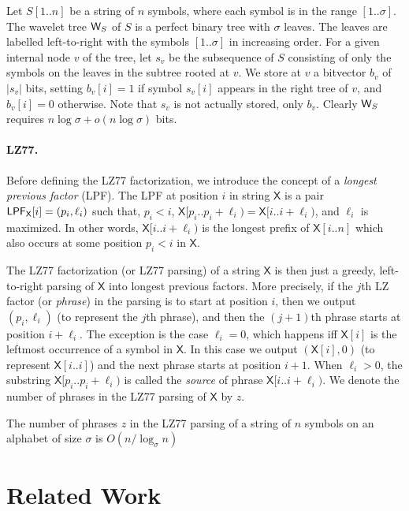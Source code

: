 \documentclass[11pt,runningheads]{llncs}
\def\X{\mathsf{X}}
\def\W{\mbox{\rm {\sf W}}}
\def\LPF{\mbox{\rm {\sf LPF}}}
\begin{document}
Let $S[1..n]$ be a string of $n$ symbols, where each symbol is in
the range $[1..\sigma]$.  The wavelet tree $\W_S$ of $S$ is a
perfect binary tree with $\sigma$ leaves. The leaves are labelled
left-to-right with the symbols $[1..\sigma]$ in increasing
order. For a given internal node $v$ of the tree, let $s_v$ be the
subsequence of $S$ consisting of only the symbols on the leaves in the
subtree rooted at $v$. We store at $v$ a bitvector $b_v$ of $|s_v|$
bits, setting $b_v[i] = 1$ if symbol $s_v[i]$ appears in the right
tree of $v$, and $b_v[i] = 0$ otherwise. Note that $s_v$ is not
actually stored, only $b_v$. Clearly $\W_S$ requires $n\log\sigma + o(n\log\sigma)$
bits.

\paragraph{LZ77.}
Before defining the LZ77 factorization, we introduce the concept of a
{\em longest previous factor} (LPF).  The LPF at position $i$ in
string $\X$ is a pair $\LPF_{\X}[i]=(p_i,\ell_i)$ such that, $p_i < i$,
$\X[p_i..p_i+\ell_i) = \X[i..i+\ell_i)$, and $\ell_i$ is maximized.
In other words, $\X[i..i+\ell_i)$ is the longest
prefix of $\X[i..n]$ which also occurs at some position $p_i < i$ in
$\X$.

The LZ77 factorization (or LZ77 parsing) of a string $\X$ is then just
a greedy, left-to-right parsing of $\X$ into longest previous
factors. More precisely, if the $j$th LZ factor (or {\em phrase}) in
the parsing is to start at position $i$, then we output $(p_i,\ell_i)$
(to represent the $j$th phrase), and then the $(j+1)$th phrase starts
at position $i+\ell_i$. The exception is the case $\ell_i=0$, which
happens iff $\X[i]$ is the leftmost occurrence of a symbol in $\X$. In
this case we output $(\X[i],0)$ (to represent $\X[i..i]$) and the next
phrase starts at position $i+1$.  When $\ell_i > 0$, the substring
$\X[p_i..p_i+\ell_i)$ is called the {\em source} of phrase
$\X[i..i+\ell_i)$. We denote the number of phrases in the LZ77 parsing
of $\X$ by $z$.

\begin{theorem}
The number of phrases $z$ in the LZ77 parsing of a string of $n$ symbols
on an alphabet of size $\sigma$ is $O(n/\log_{\sigma}n)$
\end{theorem}

\section{Related Work}
\label{sec-related}
\end{document}
